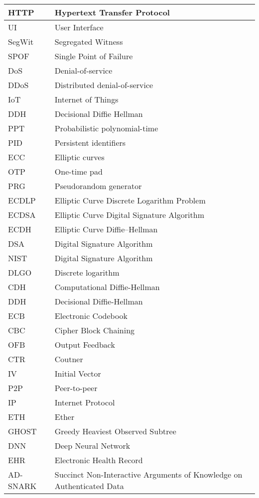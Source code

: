 \begin{center}
\begin{longtable}{ |l @{\qquad} |l| }
	HTTP    & Hypertext Transfer Protocol \\ \hline
	UI    & User Interface \\ \hline
	SegWit    & Segregated Witness \\ \hline
	SPOF    & Single Point of Failure \\ \hline
	DoS    & Denial-of-service \\ \hline
	DDoS    & Distributed denial-of-service \\ \hline
	IoT    & Internet of Things \\ \hline
	DDH    & Decisional Diffie Hellman \\ \hline
	PPT    & Probabilistic polynomial-time \\ \hline
	PID    & Persistent identifiers \\ \hline
	ECC    & Elliptic curves \\ \hline
	OTP    & One-time pad\\ \hline
	PRG    & Pseudorandom generator\\ \hline
	ECDLP    & Elliptic Curve Discrete Logarithm Problem\\ \hline
	ECDSA    & Elliptic Curve Digital Signature Algorithm\\ \hline
	ECDH    & Elliptic Curve Diffie–Hellman\\ \hline
	DSA    & Digital Signature Algorithm\\ \hline
	NIST    & Digital Signature Algorithm\\ \hline
	DLGO    & Discrete logarithm\\ \hline
	CDH    & Computational Diffie-Hellman\\ \hline
	DDH    & Decisional Diffie-Hellman\\ \hline
	ECB    & Electronic Codebook\\ \hline
	CBC    & Cipher Block Chaining\\ \hline
	OFB    & Output Feedback\\ \hline
	CTR    & Coutner\\ \hline
	IV    & Initial Vector\\ \hline
	P2P    & Peer-to-peer\\ \hline
	IP    & Internet Protocol\\ \hline
	ETH    & Ether\\ \hline
	GHOST    & Greedy Heaviest Observed Subtree\\ \hline
	DNN    & Deep Neural Network\\ \hline
	EHR    & Electronic Health Record\\ \hline
	AD-SNARK    & Succinct Non-Interactive Arguments of Knowledge on Authenticated Data\\
	\hline
	\end{longtable}
\end{center}

